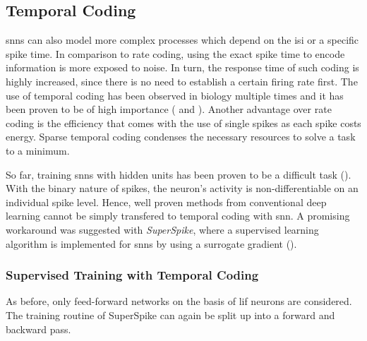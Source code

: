 \pagebreak
\subsection{Temporal Coding}
\label{temporalcoding}
\glspl{snn} can also model more complex processes which depend on the \gls{isi} or a specific spike time. In comparison to rate coding, using the exact spike time to encode information is more exposed to noise. In turn, the response time of such coding is highly increased, since there is no need to establish a certain firing rate first. The use of temporal coding has been observed in biology multiple times and it has been proven to be of high importance (\citealp{gerstner1996neuronal} and \citealp{rieke1999spikes}). Another advantage over rate coding is the efficiency that comes with the use of single spikes as each spike costs energy. Sparse temporal coding condenses the necessary resources to solve a task to a minimum.

So far, training \glspl{snn} with hidden units has been proven to be a difficult task (\citealp{pfeiffer2018deep}). With the binary nature of spikes, the neuron's activity is non-differentiable on an individual spike level. Hence, well proven methods from conventional deep learning cannot be simply transfered to temporal coding with \gls{snn}. A promising workaround was suggested with \emph{SuperSpike}, where a supervised learning algorithm is implemented for \glspl{snn} by using a surrogate gradient (\citealp{zenke2018superspike}).

\subsubsection*{Supervised Training with Temporal Coding}

As before, only feed-forward networks on the basis of \gls{lif} neurons are considered. The training routine of SuperSpike can again be split up into a forward and backward pass.


